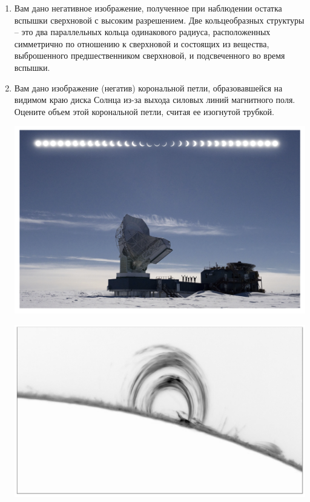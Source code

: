 \documentclass[12pt]{article}
\begin{document}
\begin{enumerate}
\begin{center}
    \end{center}
    \item Вам дано негативное изображение, полученное при наблюдении остатка вспышки сверхновой с высоким разрешением. Две кольцеобразных структуры -- это два параллельных кольца одинакового радиуса, расположенных симметрично по отношению к сверхновой и состоящих из вещества, выброшенного предшественником сверхновой, и подсвеченного во время вспышки.
    \item Вам дано изображение (негатив) корональной петли, образовавшейся на видимом краю диска Солнца из-за выхода силовых линий магнитного поля. Оцените объем этой корональной петли, считая ее изогнутой трубкой.
    
    \newpage
    
    \includegraphics[width = \linewidth]{img2.png}
    
    
    \includegraphics[width = \linewidth]{img4.png}

\end{enumerate}
\end{document}
